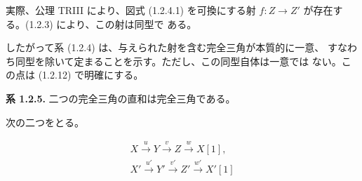 実際、公理 TRIII により、図式 (1.2.4.1) を可換にする射
$f\colon Z\longrightarrow Z'$ が存在する。(1.2.3) により、この射は同型で
ある。

したがって系 (1.2.4) は、与えられた射を含む完全三角が本質的に一意、
すなわち同型を除いて定まることを示す。ただし、この同型自体は一意では
ない。この点は (1.2.12) で明確にする。

\medskip
\noindent\textbf{系 1.2.5.}\quad
二つの完全三角の直和は完全三角である。

次の二つをとる。

\[
  \begin{gathered}
    X\xrightarrow{u}Y\xrightarrow{v}Z\xrightarrow{w}X[1],\\
    X'\xrightarrow{u'}Y'\xrightarrow{v'}Z'\xrightarrow{w'}X'[1]
  \end{gathered}
\]
\endgroup
